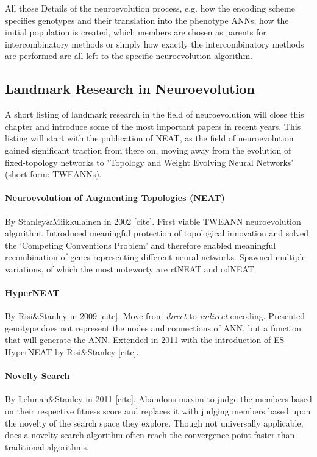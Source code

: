 \documentclass[journal, a4paper]{IEEEtran}
\begin{document}
All those Details of the neuroevolution process, e.g. how the encoding scheme specifies genotypes and their translation into the phenotype ANNs, how the initial population is created, which members are chosen as parents for intercombinatory methods or simply how exactly the intercombinatory methods are performed are all left to the specific neuroevolution algorithm.



\subsection{Landmark Research in Neuroevolution}

A short listing of landmark research in the field of neuroevolution will close this chapter and introduce some of the most important papers in recent years. This listing will start with the publication of NEAT, as the field of neuroevolution gained significant traction from there on, moving away from the evolution of fixed-topology networks to "Topology and Weight Evolving Neural Networks" (short form: TWEANNs).

\paragraph{Neuroevolution of Augmenting Topologies (NEAT)} By Stanley\&Miikkulainen in 2002 [cite]. First viable TWEANN neuroevolution algorithm. Introduced meaningful protection of topological innovation and solved the 'Competing Conventions Problem' and therefore enabled meaningful recombination of genes representing different neural networks. Spawned multiple variations, of which the most noteworty are rtNEAT and odNEAT.

\paragraph{HyperNEAT} By Risi\&Stanley in 2009 [cite]. Move from \textit{direct} to \textit{indirect} encoding. Presented genotype does not represent the nodes and connections of ANN, but a function that will generate the ANN. Extended in 2011 with the introduction of ES-HyperNEAT by Risi\&Stanley [cite].

\paragraph{Novelty Search} By Lehman\&Stanley in 2011 [cite]. Abandons maxim to judge the members based on their respective fitness score and replaces it with judging members based upon the novelty of the search space they explore. Though not universally applicable, does a novelty-search algorithm often reach the convergence point faster than traditional algorithms. 
\end{document}
